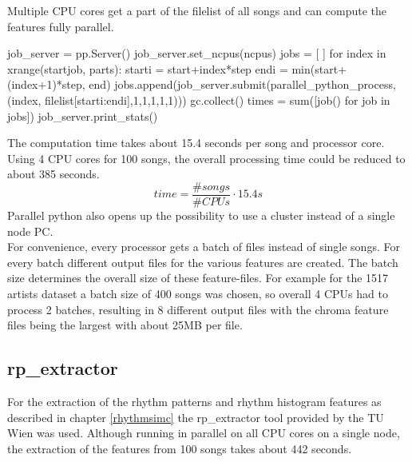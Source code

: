 Multiple CPU cores get a part of the filelist of all songs and can compute the features fully parallel.
\begin{pythonCode}
job_server = pp.Server()
job_server.set_ncpus(ncpus)
jobs = [ ]
for index in xrange(startjob, parts):
	starti = start+index*step
	endi = min(start+(index+1)*step, end)
	jobs.append(job_server.submit(parallel_python_process, (index, filelist[starti:endi],1,1,1,1,1)))
	gc.collect()
times = sum([job() for job in jobs])
job_server.print_stats()
\end{pythonCode}
The computation time takes about 15.4 seconds per song and processor core. Using 4 CPU cores for 100 songs, the overall processing time could be reduced to about 385 seconds. 
\begin{equation} \label{eq:parallelp}
time = \frac{\#songs}{\#CPUs} \cdot 15.4s
\end{equation}
Parallel python also opens up the possibility to use a cluster instead of a single node PC.\\
For convenience, every processor gets a batch of files instead of single songs. For every batch different output files for the various features are created. The batch size determines the overall size of these feature-files. For example for the 1517 artists dataset a batch size of 400 songs was chosen, so overall 4 CPUs had to process 2 batches, resulting in 8 different output files with the chroma feature files being the largest with about 25MB per file.

\subsection{rp\_extractor}

For the extraction of the rhythm patterns and rhythm histogram features as described in chapter \ref{rhythmsimc} the rp\_extractor tool provided by the TU Wien was used. Although running in parallel on all CPU cores on a single node, the extraction of the features from 100 songs takes about 442 seconds.

